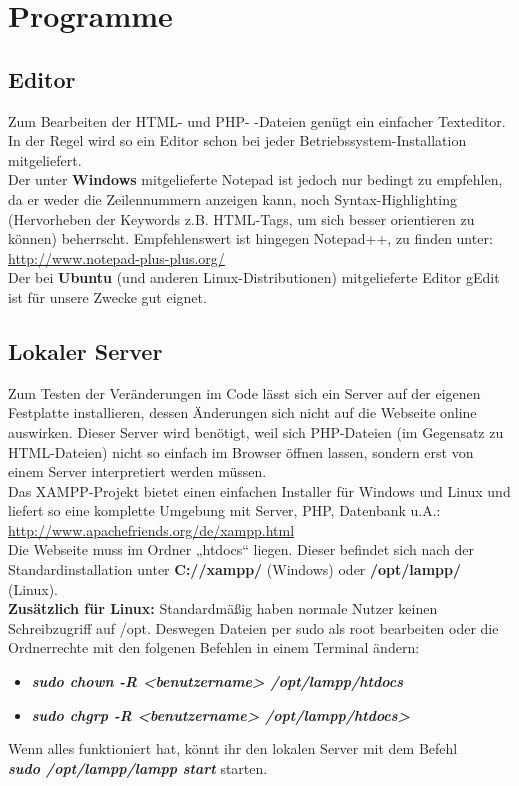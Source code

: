 \documentclass[12pt,a4paper,notitlepage,onecolumn,portrait,oneside, , , ]{scrartcl}
\begin{document}
\section{Programme}
\subsection{Editor}
Zum Bearbeiten der HTML- und PHP- -Dateien genügt ein einfacher Texteditor. In der Regel wird so ein Editor schon bei jeder Betriebssystem-Installation mitgeliefert. \\
Der unter \textbf{Windows} mitgelieferte Notepad ist jedoch nur bedingt zu empfehlen, da er weder die Zeilennummern anzeigen kann, noch Syntax-Highlighting (Hervorheben der Keywords z.B. HTML-Tags, um sich besser orientieren zu können) beherrscht. Empfehlenswert ist hingegen Notepad++, zu finden unter: \\
\url{http://www.notepad-plus-plus.org/} \\
Der bei \textbf{Ubuntu} (und anderen Linux-Distributionen) mitgelieferte Editor gEdit ist für unsere Zwecke gut eignet.

\subsection{Lokaler Server}
Zum Testen der Veränderungen im Code lässt sich ein Server auf der eigenen Festplatte installieren, dessen Änderungen sich nicht auf die Webseite online auswirken. Dieser Server wird benötigt, weil sich PHP-Dateien (im Gegensatz zu HTML-Dateien) nicht so einfach im Browser öffnen lassen, sondern erst von einem Server interpretiert werden müssen. \\
Das XAMPP-Projekt bietet einen einfachen Installer für Windows und Linux und liefert so eine komplette Umgebung mit Server, PHP, Datenbank u.A.: \\ \url{http://www.apachefriends.org/de/xampp.html} \\
Die Webseite muss im Ordner „htdocs“ liegen. Dieser befindet sich nach der Standardinstallation unter \textbf{C://xampp/} (Windows) oder \textbf{/opt/lampp/} (Linux).\\
\textbf{Zusätzlich für Linux:} Standardmäßig haben normale Nutzer keinen Schreibzugriff auf /opt. Deswegen Dateien per sudo als root bearbeiten oder die Ordnerrechte mit den folgenen Befehlen in einem Terminal ändern: \\
\begin{itemize}
\item \textbf{\textit{sudo chown -R <benutzername> /opt/lampp/htdocs}}
\item \textbf{\textit{sudo chgrp -R <benutzername> /opt/lampp/htdocs>}}
\end{itemize}
Wenn alles funktioniert hat, könnt ihr den lokalen Server mit dem Befehl\\ \textbf{\textit{sudo /opt/lampp/lampp start}} starten.
\end{document}
